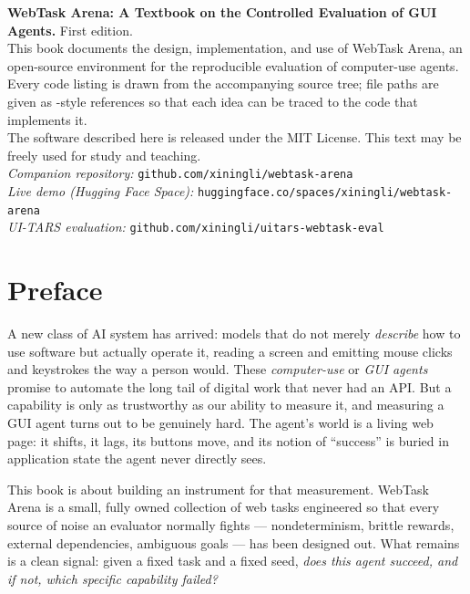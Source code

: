 \documentclass[11pt,openany]{book}
\newcommand{\code}[1]{\textcolor{clayd}{\texttt{\detokenize{#1}}}}
\begin{document}
\clearpage
\thispagestyle{empty}
\vspace*{\fill}
{\small
\textbf{WebTask Arena: A Textbook on the Controlled Evaluation of GUI Agents.}
First edition.\\[6pt]
This book documents the design, implementation, and use of WebTask Arena, an
open-source environment for the reproducible evaluation of computer-use agents.
Every code listing is drawn from the accompanying source tree; file paths are
given as \code{server/app.py}-style references so that each idea can be traced to
the code that implements it.\\[6pt]
The software described here is released under the MIT License. This text may be
freely used for study and teaching.\\[10pt]
\textit{Companion repository:} \texttt{github.com/xiningli/webtask-arena}\\
\textit{Live demo (Hugging Face Space):} \texttt{huggingface.co/spaces/xiningli/webtask-arena}\\
\textit{UI-TARS evaluation:} \texttt{github.com/xiningli/uitars-webtask-eval}
\par}
\vspace*{\fill}

\chapter*{Preface}

A new class of AI system has arrived: models that do not merely \emph{describe}
how to use software but actually operate it, reading a screen and emitting mouse
clicks and keystrokes the way a person would. These \emph{computer-use} or
\emph{GUI agents} promise to automate the long tail of digital work that never
had an API. But a capability is only as trustworthy as our ability to measure
it, and measuring a GUI agent turns out to be genuinely hard. The agent's world
is a living web page: it shifts, it lags, its buttons move, and its notion of
``success'' is buried in application state the agent never directly sees.

This book is about building an instrument for that measurement. WebTask Arena is
a small, fully owned collection of web tasks engineered so that every source of
noise an evaluator normally fights — nondeterminism, brittle rewards, external
dependencies, ambiguous goals — has been designed out. What remains is a clean
signal: given a fixed task and a fixed seed, \emph{does this agent succeed, and
if not, which specific capability failed?}
\end{document}
